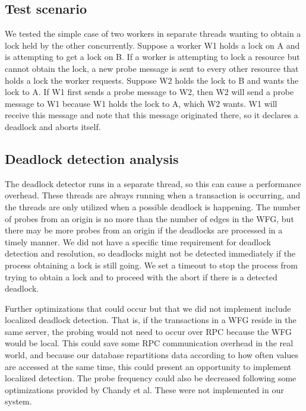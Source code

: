 \documentclass[a4paper, 10pt, notitlepage]{report}
\begin{document}
\subsection*{Test scenario}

We tested the simple case of two workers in separate threads wanting to obtain a lock held by the other concurrently. Suppose a worker W1 holds a lock on A and is attempting to get a lock on B. If a worker is attempting to lock a resource but cannot obtain the lock, a new probe message is sent to every other resource that holds a lock the worker requests. Suppose W2 holds the lock to B and wants the lock to A. If W1 first sends a probe message to W2, then W2 will send a probe message to W1 because W1 holds the lock to A, which W2 wants. W1 will receive this message and note that this message originated there, so it declares a deadlock and aborts itself.

\subsection*{Deadlock detection analysis}
The deadlock detector runs in a separate thread, so this can cause a performance overhead. These threads are always running when a transaction is occurring, and the threads are only utilized when a possible deadlock is happening. The number of probes from an origin is no more than the number of edges in the WFG, but there may be more probes from an origin if the deadlocks are processed in a timely manner. We did not have a specific time requirement for deadlock detection and resolution, so deadlocks might not be detected immediately if the process obtaining a lock is still going. We set a timeout to stop the process from trying to obtain a lock and to proceed with the abort if there is a detected deadlock.

Further optimizations that could occur but that we did not implement include localized deadlock detection. That is, if the transactions in a WFG reside in the same server, the probing would not need to occur over RPC because the WFG would be local. This could save some RPC communication overhead in the real world, and because our database repartitions data according to how often values are accessed at the same time, this could present an opportunity to implement localized detection. The probe frequency could also be decreased following some optimizations provided by Chandy et al. These were not implemented in our system.
\end{document}
